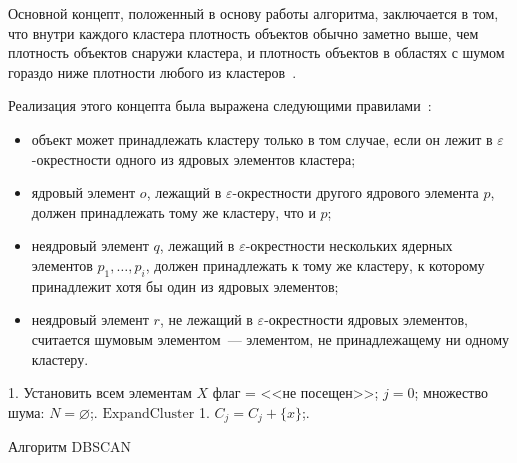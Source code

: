 Основной концепт, положенный в основу работы алгоритма, заключается в том, что внутри каждого кластера плотность объектов обычно заметно выше, чем плотность объектов снаружи кластера, и плотность объектов в областях с шумом гораздо ниже плотности любого из кластеров~\cite{dbscan-pos}.

Реализация этого концепта была выражена следующими правилами~\cite{cod}:
\begin{itemize}
    \item объект может принадлежать кластеру только в том случае, если он лежит в \( \varepsilon \)-окрестности одного из ядровых элементов кластера;
    \item ядровый элемент \( o \), лежащий в \( \varepsilon \)-окрестности другого ядрового элемента \( p \), должен принадлежать тому же кластеру, что и \( p \);
    \item неядровый элемент \( q \), лежащий в \( \varepsilon \)-окрестности нескольких ядерных элементов \( p_1, \ldots, p_i \), должен принадлежать к тому же кластеру, к которому принадлежит хотя бы один из ядровых элементов;
    \item неядровый элемент \( r \), не лежащий в \( \varepsilon \)-окрестности ядровых элементов, считается шумовым элементом~--- элементом, не принадлежащему ни одному кластеру.
\end{itemize}

\begin{algorithm}[t!]
    \DontPrintSemicolon
    1. Установить всем элементам \( X \) флаг = <<не посещен>>; \( j = 0 \); множество шума: \( N = \varnothing \);. 
    \BlankLine
    \( \mathrm{ExpandCluster} \)\;
    1. \( C_j = C_j + \{x\} \);. 
    \caption{Алгоритм DBSCAN}
    \label{alg:dbscan}
\end{algorithm}

